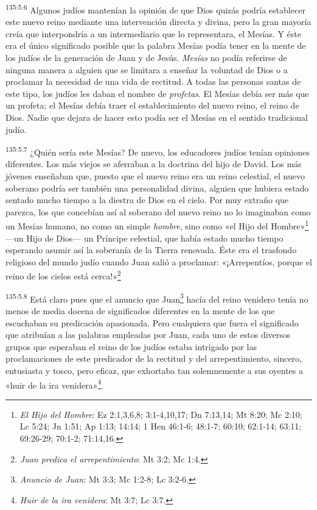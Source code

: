 \par
\textsuperscript{135:5.6} Algunos judíos mantenían la opinión de que Dios quizás podría establecer este nuevo reino mediante una intervención directa y divina, pero la gran mayoría creía que interpondría a un intermediario que lo representara, el Mesías. Y éste era el único significado posible que la palabra Mesías podía tener en la mente de los judíos de la generación de Juan y de Jesús. \textit{Mesías} no podía referirse de ninguna manera a alguien que se limitara a enseñar la voluntad de Dios o a proclamar la necesidad de una vida de rectitud. A todas las personas santas de este tipo, los judíos les daban el nombre de \textit{profetas}. El Mesías debía ser más que un profeta; el Mesías debía traer el establecimiento del nuevo reino, el reino de Dios. Nadie que dejara de hacer esto podía ser el Mesías en el sentido tradicional judío.

\par
\textsuperscript{135:5.7} ¿Quién sería este Mesías? De nuevo, los educadores judíos tenían opiniones diferentes. Los más viejos se aferraban a la doctrina del hijo de David. Los más jóvenes enseñaban que, puesto que el nuevo reino era un reino celestial, el nuevo soberano podría ser también una personalidad divina, alguien que hubiera estado sentado mucho tiempo a la diestra de Dios en el cielo. Por muy extraño que parezca, los que concebían así al soberano del nuevo reino no lo imaginaban como un Mesías humano, no como un simple \textit{hombre}, sino como «el Hijo del Hombre»\footnote{\textit{El Hijo del Hombre}: Ez 2:1,3,6,8; 3:1-4,10,17; Dn 7:13,14; Mt 8:20; Mc 2:10; Lc 5:24; Jn 1:51; Ap 1:13; 14:14; 1 Hen 46:1-6; 48:1-7; 60:10; 62:1-14; 63:11; 69:26-29; 70:1-2; 71:14,16.} ---un Hijo de Dios--- un Príncipe celestial, que había estado mucho tiempo esperando asumir así la soberanía de la Tierra renovada. Éste era el trasfondo religioso del mundo judío cuando Juan salió a proclamar: «¡Arrepentíos, porque el reino de los cielos está cerca!»\footnote{\textit{Juan predica el arrepentimiento}: Mt 3:2; Mc 1:4.}

\par
\textsuperscript{135:5.8} Está claro pues que el anuncio que Juan\footnote{\textit{Anuncio de Juan}: Mt 3:3; Mc 1:2-8; Lc 3:2-6.} hacía del reino venidero tenía no menos de media docena de significados diferentes en la mente de los que escuchaban su predicación apasionada. Pero cualquiera que fuera el significado que atribuían a las palabras empleadas por Juan, cada uno de estos diversos grupos que esperaban el reino de los judíos estaba intrigado por las proclamaciones de este predicador de la rectitud y del arrepentimiento, sincero, entusiasta y tosco, pero eficaz, que exhortaba tan solemnemente a sus oyentes a «huir de la ira venidera»\footnote{\textit{Huir de la ira venidera}: Mt 3:7; Lc 3:7.}.

